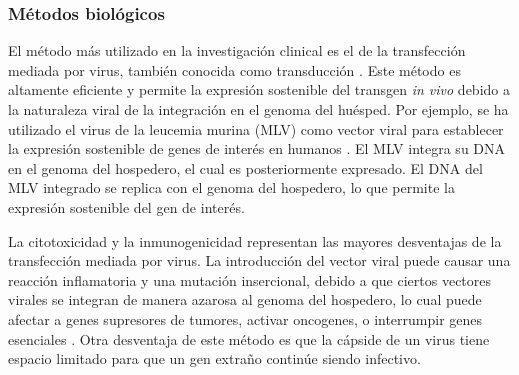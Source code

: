 \documentclass[fleqn,10pt]{SelfArx} %
\begin{document}



\subsubsection{Métodos biológicos}
El método más utilizado en la investigación clinical es el de la transfección mediada por virus, también conocida como transducción \cite{Pfeifer:2001aa}. Este método es altamente eficiente y permite la expresión sostenible del transgen \textit{in vivo} debido a la naturaleza viral de la integración en el genoma del huésped. Por ejemplo, se ha utilizado el virus de la leucemia murina (MLV)  como vector viral para establecer la expresión sostenible de genes de interés en humanos \cite{Hacein-Bey-Abina:2002aa, Roesler:2002aa}. El MLV integra su DNA en el genoma del hospedero, el cual es posteriormente expresado. El DNA del MLV integrado se replica con el genoma del hospedero, lo que permite la expresión sostenible del gen de interés.

La citotoxicidad y la inmunogenicidad representan las mayores desventajas de la transfección mediada por virus. La introducción del vector viral puede causar una reacción inflamatoria y una mutación insercional, debido a que ciertos vectores virales se integran de manera azarosa al genoma del hospedero, lo cual puede afectar a genes supresores de tumores, activar oncogenes, o interrumpir genes esenciales \cite{Woods:2003aa}. Otra desventaja de este método es que la cápside de un virus tiene espacio limitado para que un gen extraño continúe siendo infectivo. 
\end{document}
